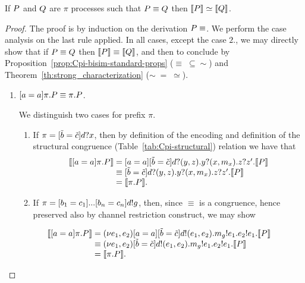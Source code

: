 \begin{lemma}\label{lem:encode-struct-to-bisim}
If $P$ and $Q$ are $\pi$ processes such that $P\equiv Q$  then $\llbracket P \rrbracket \simeq \llbracket Q \rrbracket$.
\end{lemma}
%
\begin{proof}
The proof is by induction on the derivation $P\equiv$. We perform the case analysis on the last rule applied. In all cases, except the case $2$., we may directly show that if $P\equiv Q$ then $\llbracket P \rrbracket \equiv \llbracket Q \rrbracket$, and then to conclude by Proposition~\ref{prop:Cpi-bisim-standard-props} ($\equiv\;\subseteq \sim$) and Theorem~\ref{th:strong_characterization} ($\sim \;=\; \simeq$).
\begin{enumerate}
\item $[ a = a ]\pi.P \equiv \pi.P$.

We distinguish two cases for prefix $\pi$. 
	\begin{enumerate}
	\item If $\pi=[ \tilde{b} = \tilde{c} ]d?x$,
	then by definition of the encoding and definition of the structural congruence (Table~\ref{tab:Cpi-structural}) relation we have that 
	\[
	\begin{array}{l@{\;}c@{\;}l}
	\enc{\match\NA\role\msg\NA\pi.\PP} 
	& = &
	\match\NA\role\msg\NA\match{\tilde{\NB}}\role\msg{\tilde{\NC}}
	\receive\ND\role\msg{(\NY,\NZ)}.\receive\NY\role\msg{(\NX,\NM_\NX)}.\receive{\NZ}\role\msg{\NZ'}.\enc{\PP} \\
	&\equiv &
	\match{\tilde{\NB}}\role\msg{\tilde{\NC}}
	\receive\ND\role\msg{(\NY,\NZ)}.\receive\NY\role\msg{(\NX,\NM_\NX)}.\receive{\NZ}\role\msg{\NZ'}.\enc{\PP} \\
	& = & 
	\enc{\pi.\PP}.
	\end{array}
	\]

	\item If $\pi=[ b_1 = c_1 ]...[ b_n = c_n ]d!g$,
	then, since $\equiv$ is a congruence, hence preserved also by channel restriction construct, we may show 

	\[
	\begin{array}{l@{\;}c@{\;}l}
	\hspace{-8mm}\enc{\match\NA\role\msg\NA\pi.\PP} 
	& = &  \rest{\NE_1, \NE_2}\match\NA\role\msg\NA\match{\tilde{\NB}}\role\msg{\tilde{\NC}}\send{\ND}\role\msg{(\NE_1,\NE_2)}.\send{\NM_\NGG}\role\msg{\NE_1}.\send{\NE_2}\role\msg{\NE_1}. \enc{ \PP } \\
	& \equiv &  \rest{\NE_1, \NE_2}\match{\tilde{\NB}}\role\msg{\tilde{\NC}}\send{\ND}\role\msg{(\NE_1,\NE_2)}.\send{\NM_\NGG}\role\msg{\NE_1}.\send{\NE_2}\role\msg{\NE_1}. \enc{ \PP }\\
	& = & 
	\enc{\pi.\PP}.
	\end{array}
	\]
	\end{enumerate}


\end{enumerate}
\end{proof}
